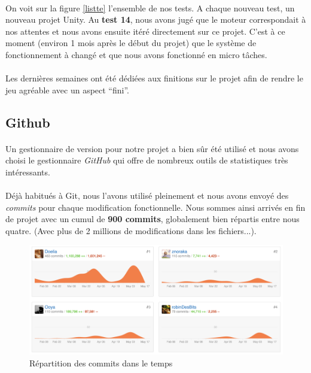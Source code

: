 \paragraph{}
On voit sur la figure \ref{listte} l'ensemble de nos tests. A chaque nouveau test, un nouveau projet Unity. Au \textbf{test 14}, nous avons jugé que le moteur correspondait à nos attentes et nous avons ensuite itéré directement sur ce projet. C’est à ce moment (environ 1 mois après le début du projet) que le système de fonctionnement à changé et que nous avons fonctionné en micro tâches.

\paragraph{}
Les dernières semaines ont été dédiées aux finitions sur le projet afin de rendre le jeu agréable avec un aspect “fini”.

\subsection{Github}

\paragraph{}
Un gestionnaire de version pour notre projet a bien sûr été utilisé et nous avons choisi le gestionnaire \emph{GitHub} qui offre de nombreux outils de statistiques très intéressants.

\paragraph{}
Déjà habitués à Git, nous l'avons utilisé pleinement et nous avons envoyé des \emph{commits} pour chaque modification fonctionnelle. Nous sommes ainsi arrivés en fin de projet avec un cumul de \textbf{900 commits}, globalement bien répartis entre nous quatre. (Avec plus de 2 millions de modifications dans les fichiers...).

\begin{figure}[H]\centering
  \includegraphics[scale=.85]{./img/github_commits.png}
  \caption{Répartition des commits dans le temps}
  \label{github_commits}
\end{figure}

